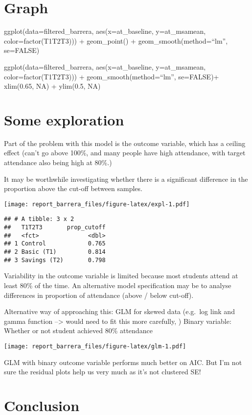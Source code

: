 \documentclass[
]{article}
\begin{document}
\hypertarget{graph}{%
\section{Graph}\label{graph}}

ggplot(data=filtered\_barrera, aes(x=at\_baseline, y=at\_msamean,
color=factor(T1T2T3))) + geom\_point() + geom\_smooth(method=``lm'',
se=FALSE)

ggplot(data=filtered\_barrera, aes(x=at\_baseline, y=at\_msamean,
color=factor(T1T2T3))) + geom\_smooth(method=``lm'', se=FALSE)+
xlim(0.65, NA) + ylim(0.5, NA)

\hypertarget{some-exploration}{%
\section{Some exploration}\label{some-exploration}}

Part of the problem with this model is the outcome variable, which has a
ceiling effect (can't go above 100\%, and many people have high
attendance, with target attendance also being high at 80\%.)

It may be worthwhile investigating whether there is a significant
difference in the proportion above the cut-off between samples.

\texttt{[image: report\_barrera\_files/figure-latex/expl-1.pdf]}

\begin{verbatim}
## # A tibble: 3 x 2
##   T1T2T3       prop_cutoff
##   <fct>              <dbl>
## 1 Control            0.765
## 2 Basic (T1)         0.814
## 3 Savings (T2)       0.798
\end{verbatim}

Variability in the outcome variable is limited because most students
attend at least 80\% of the time. An alternative model specification may
be to analyse differences in proportion of attendance (above / below
cut-off).

Alternative way of approaching this: GLM for skewed data (e.g.~log link
and gamma function --\textgreater{} would need to fit this more
carefully, ) Binary variable: Whether or not student achieved 80\%
attendance

\texttt{[image: report\_barrera\_files/figure-latex/glm-1.pdf]}

GLM with binary outcome variable performs much better on AIC. But I'm
not sure the residual plots help us very much as it's not clustered SE!

\hypertarget{conclusion}{%
\section{Conclusion}\label{conclusion}}
\end{document}
